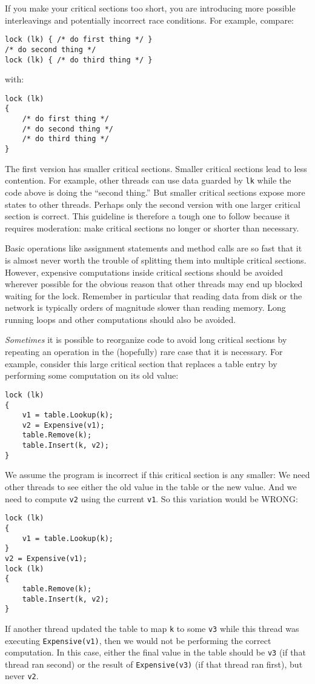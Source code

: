 \documentclass[10pt]{article}
\begin{document}
If you make your critical sections too short, you are introducing more
possible interleavings and potentially incorrect race conditions.  For
example, compare:
\begin{verbatim}
lock (lk) { /* do first thing */ }
/* do second thing */
lock (lk) { /* do third thing */ }
\end{verbatim}
with:
\begin{verbatim}
lock (lk)
{
    /* do first thing */
    /* do second thing */
    /* do third thing */
}
\end{verbatim}
The first version has smaller critical sections.  Smaller critical
sections lead to less contention.  For example, other threads can use
data guarded by {\tt lk} while the code above is doing the ``second
thing.''  But smaller critical sections expose more states to other
threads.  Perhaps only the second version with one larger critical
section is correct.  This guideline is therefore a tough one to follow
because it requires moderation: make critical sections no longer or
shorter than necessary.

Basic operations like assignment statements and method calls are so
fast that it is almost never worth the trouble of splitting them into
multiple critical sections.  However, expensive computations inside
critical sections should be avoided wherever possible for the obvious
reason that other threads may end up blocked waiting for the lock.
Remember in particular that reading data from disk or the network is
typically orders of magnitude slower than reading memory.  Long
running loops and other computations should also be avoided.

\emph{Sometimes} it is possible to reorganize code to avoid long
critical sections by repeating an operation in the (hopefully) rare
case that it is necessary.  For example, consider this large critical
section that replaces a table entry by performing some computation on
its old value:
\begin{verbatim}
lock (lk)
{
    v1 = table.Lookup(k);
    v2 = Expensive(v1);
    table.Remove(k);
    table.Insert(k, v2);
}
\end{verbatim}
We assume the program is incorrect if this critical section is any
smaller: We need other threads to see either the old value in the
table or the new value.  And we need to compute {\tt v2} using the
current {\tt v1}.  So this variation would be WRONG:
\begin{verbatim}
lock (lk)
{
    v1 = table.Lookup(k);
}
v2 = Expensive(v1);
lock (lk)
{
    table.Remove(k);
    table.Insert(k, v2);
}
\end{verbatim}
If another thread updated the table to map {\tt k} to some {\tt v3}
while this thread was executing {\tt Expensive(v1)}, then we would not
be performing the correct computation.  In this case, either the final
value in the table should be {\tt v3} (if that thread ran second) or
the result of {\tt Expensive(v3)} (if that thread ran first), but
never {\tt v2}.
\end{document}
